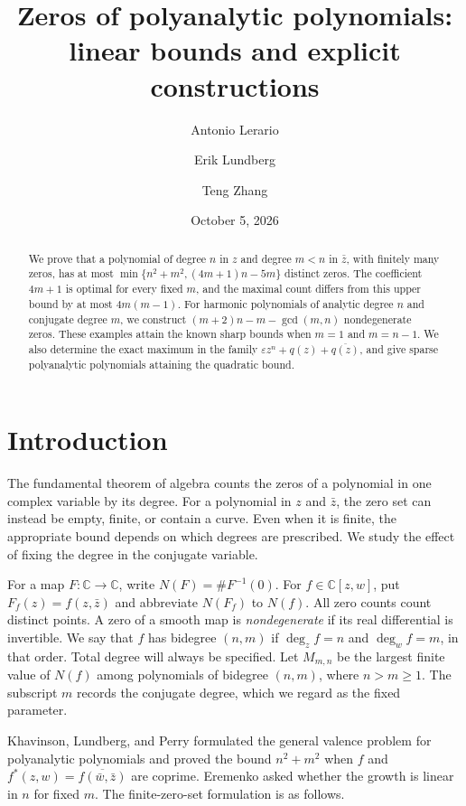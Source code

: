 \documentclass[a4paper]{amsart}
\title[Zeros of polyanalytic polynomials]{Zeros of polyanalytic polynomials:\\
linear bounds and explicit constructions}
\author{Antonio Lerario}
\author{Erik Lundberg}
\author{Teng Zhang}
\date{October 5, 2026}
\theoremstyle{remark}
\newcommand{\C}{\mathbb C}
\newcommand{\eps}{\varepsilon}
\begin{document}
\begin{abstract}
We prove that a polynomial of degree \(n\) in \(z\) and degree \(m<n\)
in \(\bar z\), with finitely many zeros, has at most
\(\min\{n^2+m^2,(4m+1)n-5m\}\) distinct zeros. The coefficient \(4m+1\)
is optimal for every fixed \(m\), and the maximal count differs from
this upper bound by at most \(4m(m-1)\).
For harmonic polynomials of analytic degree \(n\) and conjugate degree
\(m\), we construct \((m+2)n-m-\gcd(m,n)\) nondegenerate zeros.
These examples attain the known sharp bounds when \(m=1\) and \(m=n-1\).
We also determine the exact maximum in the family
\(\eps z^n+q(z)+\overline{q(z)}\), and give sparse polyanalytic
polynomials attaining the quadratic bound.
\end{abstract}
\maketitle

\section{Introduction}\label{sec:intro}

The fundamental theorem of algebra counts the zeros of a polynomial
in one complex variable by its degree. For a polynomial in \(z\) and
\(\bar z\), the zero set can instead be empty, finite, or contain a
curve. Even when it is finite, the appropriate bound depends on which
degrees are prescribed. We study the effect of fixing the degree in
the conjugate variable.

For a map \(F:\C\to\C\), write \(N(F)=\#F^{-1}(0)\).
For \(f\in\C[z,w]\), put \(F_f(z)=f(z,\bar z)\) and abbreviate
\(N(F_f)\) to \(N(f)\). All zero counts count distinct points.
A zero of a smooth map is \emph{nondegenerate} if its real
differential is invertible.
We say that \(f\) has bidegree \((n,m)\) if
\(\deg_z f=n\) and \(\deg_w f=m\), in that order. Total degree will
always be specified. Let \(M_{m,n}\) be the largest finite value of
\(N(f)\) among polynomials of bidegree \((n,m)\), where \(n>m\ge1\).
The subscript \(m\) records the conjugate degree, which we regard as
the fixed parameter.

Khavinson, Lundberg, and Perry \cite[Problem 1.9 and Proposition 1.10]{KLP24}
formulated the general valence problem for polyanalytic polynomials
and proved the bound \(n^2+m^2\) when \(f\) and
\(f^*(z,w)=\overline{f(\bar w,\bar z)}\) are coprime. Eremenko
\cite[p.~1]{Ere26} asked whether the growth is linear in \(n\) for fixed
\(m\). The finite-zero-set formulation is as follows.
\end{document}
